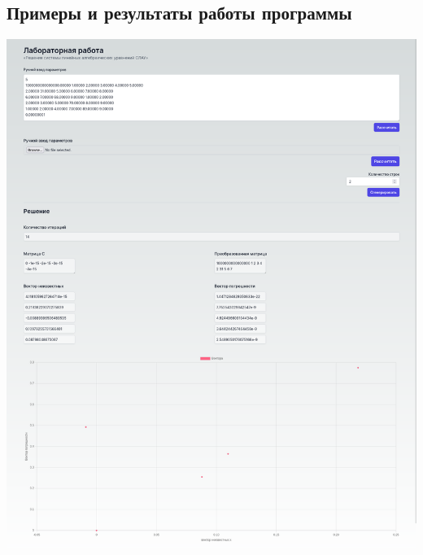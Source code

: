 \documentclass{article}
\begin{document}
\subsection{Примеры и результаты работы программы}
      \begin{center}
            \includegraphics[scale=0.25]{solution1.png}


\end{center}
\end{document}
